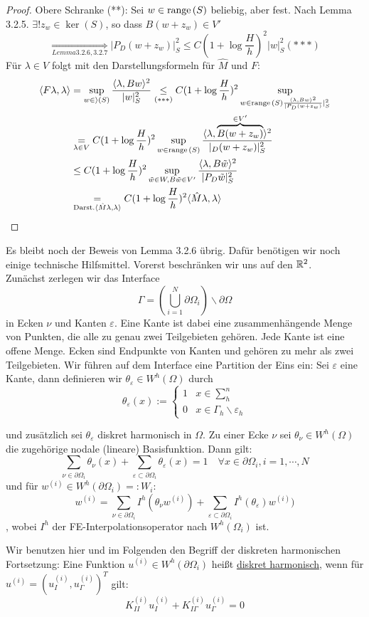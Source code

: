 \begin{proof}
  Obere Schranke (**):
Sei $w\in\textnormal{range}\,(S)$ beliebig, aber fest. Nach Lemma 3.2.5. $\exists! z_w\in\ker(S)$, so dass $B(w+z_w)\in V'$
\[
  \underset{Lemma 3.2.6,3.2.7}{\Longrightarrow} |P_D(w+z_w)|_S^2 \leq C(1+\log \frac{H}{h})^2 |w|_S^2 (***)
\]
Für $\lambda\in V$ folgt mit den Darstellungsformeln für $\hat{M}$ und $F$: 
\begin{align*}
  \langle F\lambda,\lambda\rangle &= \sup_{w\in\rangle(S)}\frac{\langle\lambda,Bw\rangle^2}{|w|_S^2} \underset{(***)}{\leq} C(1+\log \frac{H}{h})^2 \sup_{w\in\textnormal{range}\,(S)\frac{\langle\lambda,Bw\rangle^2}{|P_D(w+z_w)}|_S^2}\\
  &\underset{\lambda\in V}{=} C(1+\log \frac{H}{h})^2 \sup_{w\in\textnormal{range}\,(S)} \frac{\langle\lambda,\overbrace{B(w+z_w)}^{\in V'}\rangle^2}{|_D(w+z_w)|_S^2}\\
  &\leq C(1+\log \frac{H}{h})^2 \sup_{\tilde{w}\in W, B\tilde{w}\in V'} \frac{\langle\lambda,B\tilde{w}\rangle^2}{|P_D\tilde{w}|_S^2}\\
  &\underset{\text{Darst.} \langle\hat{M}\lambda,\lambda\rangle}{=} C(1+\log \frac{H}{h})^2 \langle\hat{M}\lambda,\lambda\rangle
\end{align*}
\end{proof}

Es bleibt noch der Beweis von Lemma 3.2.6 übrig. Dafür benötigen wir noch einige technische Hilfsmittel. Vorerst beschränken wir uns auf den $\mathbb{R}^2$. \\

Zunächst zerlegen wir das Interface 
\[
  \Gamma = \left( \bigcup_{i=1}^N \partial\Omega_i \right) \backslash \partial\Omega
\]
in Ecken $\nu$ und Kanten $\varepsilon$. Eine Kante ist dabei eine zusammenhängende Menge von Punkten, die alle zu genau zwei Teilgebieten gehören. Jede Kante ist eine offene Menge. Ecken sind Endpunkte von Kanten und gehören zu mehr als zwei Teilgebieten. Wir führen auf dem Interface eine Partition der Eins ein: 
Sei $\varepsilon$ eine Kante, dann definieren wir $\theta_{\varepsilon} \in W^h(\Omega)$ durch
\[
  \theta_{\varepsilon}(x):= 
  \begin{cases}
    1 &x\in \sum_h^n\\
    0 &x\in \Gamma_h\backslash\varepsilon_h
  \end{cases}
\]

und zusätzlich sei $\theta_\varepsilon$ diskret harmonisch in $\Omega$. Zu einer Ecke $\nu$ sei $\theta_\nu\in W^h(\Omega)$ die zugehörige nodale (lineare) Basisfunktion. Dann gilt: 
\[
  \sum_{\nu\in\partial\Omega_i} \theta_\nu(x) + \sum_{\varepsilon\subset\partial\Omega_i} \theta_\varepsilon(x) =1 \quad \forall x\in \partial\Omega_i, i=1,\cdots,N
\]
und für $w^{(i)}\in W^h(\partial\Omega_i)=: W_i$:
\[
  w^{(i)}=\sum_{\nu\in\partial\Omega_i} I^h(\theta_\nu w^{(i)})+\sum_{\varepsilon\subset\partial\Omega_i} I^h(\theta_\varepsilon)w^{(i)})
\],
wobei $I^h$ der FE-Interpolationsoperator nach $W^h(\Omega_i)$ ist. 

Wir benutzen hier und im Folgenden den Begriff der diskreten harmonischen Fortsetzung: 
Eine Funktion $u^{(i)}\in W^h(\partial\Omega_i)$ heißt \underline{diskret harmonisch}, wenn für $u^{(i)}=(u_I^{(i)},u_\Gamma^{(i)})^T$ gilt:
\[
  K_{II}^{(i)}u_I^{(i)}+K_{I\Gamma}^{(i)}u_\Gamma^{(i)} = 0 
\]

